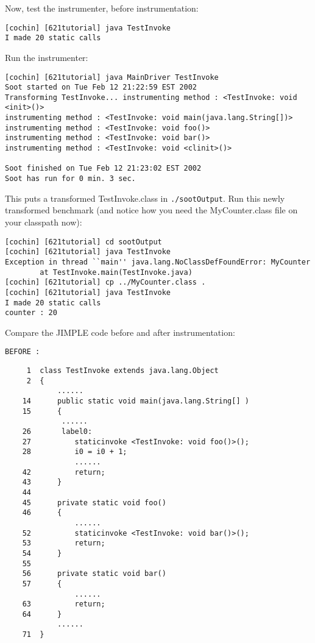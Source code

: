 \documentclass[12pt]{article}
\begin{document}
\noindent
Now, test the instrumenter, before instrumentation:
\begin{verbatim}
[cochin] [621tutorial] java TestInvoke
I made 20 static calls
\end{verbatim}

\noindent
Run the instrumenter:
\begin{verbatim}
[cochin] [621tutorial] java MainDriver TestInvoke
Soot started on Tue Feb 12 21:22:59 EST 2002
Transforming TestInvoke... instrumenting method : <TestInvoke: void <init>()>
instrumenting method : <TestInvoke: void main(java.lang.String[])>
instrumenting method : <TestInvoke: void foo()>
instrumenting method : <TestInvoke: void bar()>
instrumenting method : <TestInvoke: void <clinit>()>
 
Soot finished on Tue Feb 12 21:23:02 EST 2002
Soot has run for 0 min. 3 sec.
\end{verbatim}

\noindent
This puts a transformed TestInvoke.class in {\tt ./sootOutput}.
Run this newly transformed benchmark (and notice how you need the
MyCounter.class file on your classpath now):
\begin{verbatim}
[cochin] [621tutorial] cd sootOutput
[cochin] [621tutorial] java TestInvoke
Exception in thread ``main'' java.lang.NoClassDefFoundError: MyCounter
        at TestInvoke.main(TestInvoke.java)
[cochin] [621tutorial] cp ../MyCounter.class .
[cochin] [621tutorial] java TestInvoke
I made 20 static calls
counter : 20
\end{verbatim}

\noindent
Compare the JIMPLE code before and after instrumentation:

\noindent
{\tt BEFORE :}
\begin{verbatim}
     1  class TestInvoke extends java.lang.Object
     2  {
            ......
    14      public static void main(java.lang.String[] )
    15      {
             ......
    26       label0:
    27          staticinvoke <TestInvoke: void foo()>();
    28          i0 = i0 + 1;
                ......
    42          return;
    43      }
    44
    45      private static void foo()
    46      {
                ......
    52          staticinvoke <TestInvoke: void bar()>();
    53          return;
    54      }
    55
    56      private static void bar()
    57      {
                ......
    63          return;
    64      }
            ......
    71  }
\end{verbatim}
\end{document}
